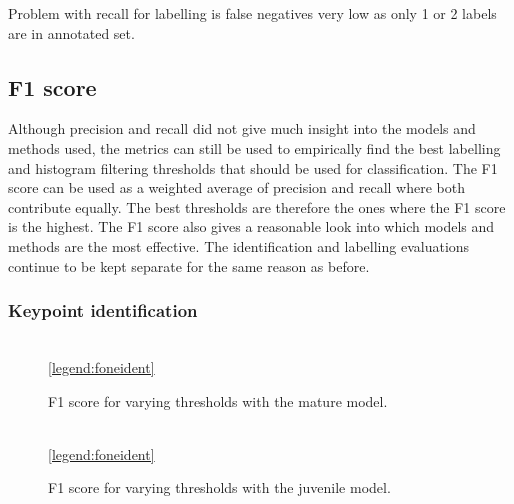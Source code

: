 Problem with recall for labelling is false negatives very low as only 1 or 2 labels are in annotated set. 


\subsection{F1 score}
Although precision and recall did not give much insight into the models and methods used, the metrics can still be used to empirically find the best labelling and histogram filtering thresholds that should be used for classification. The F1 score can be used as a weighted average of precision and recall where both contribute equally. The best thresholds are therefore the ones where the F1 score is the highest. The F1 score also gives a reasonable look into which models and methods are the most effective. The identification and labelling evaluations continue to be kept separate for the same reason as before. 
\subsubsection{Keypoint identification}

\begin{figure}[H]
\centering
{}
\\
\ref{legend:foneident}
\caption{F1 score for varying thresholds with the mature model.}
\label{fig:fonemature}
\end{figure}

\begin{figure}[H]
\centering
{}
\\
\ref{legend:foneident}
\caption{F1 score for varying thresholds with the juvenile model.}
\label{fig:fonejuvenile}
\end{figure}

